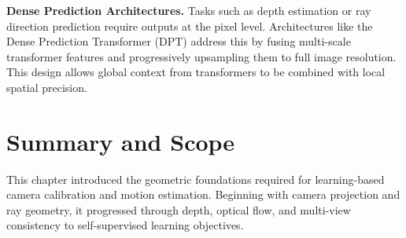 \textbf{Dense Prediction Architectures.}
Tasks such as depth estimation or ray direction prediction require outputs at the pixel level. Architectures like the Dense Prediction Transformer (DPT) address this by fusing multi-scale transformer features and progressively upsampling them to full image resolution. This design allows global context from transformers to be combined with local spatial precision.

\section{Summary and Scope}
This chapter introduced the geometric foundations required for learning-based camera calibration and motion estimation. Beginning with camera projection and ray geometry, it progressed through depth, optical flow, and multi-view consistency to self-supervised learning objectives.